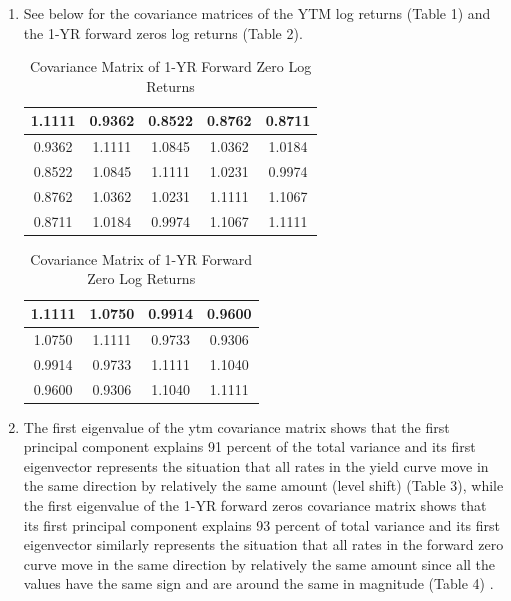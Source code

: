 \documentclass{article}
\begin{document}
\begin{enumerate}
\begin{enumerate}
    \end{enumerate}
    \item See below for the covariance matrices of the YTM log returns (Table 1) and the 1-YR forward zeros log returns (Table 2).
        \begin{table}[H]
        \begin{minipage}{0.5\linewidth}
        \centering
        \caption{Covariance Matrix of YTM Log Returns}
        \begin{tabular}{|c|c|c|c|c|}
        \hline
        1.1111 & 0.9362 & 0.8522 & 0.8762 & 0.8711 \\ \hline
        0.9362 & 1.1111 & 1.0845 & 1.0362 & 1.0184 \\ \hline
        0.8522 & 1.0845 & 1.1111 & 1.0231 & 0.9974 \\ \hline
        0.8762 & 1.0362 & 1.0231 & 1.1111 & 1.1067 \\ \hline
        0.8711 & 1.0184 & 0.9974 & 1.1067 & 1.1111 \\ \hline

     
        \end{tabular}
        \end{minipage}
        \hfill
        \begin{minipage}{0.5\linewidth}
        \centering
        \caption{Covariance Matrix of 1-YR Forward Zero Log Returns}
        \begin{tabular}{|c|c|c|c|}
        \hline
        1.1111 & 1.0750 & 0.9914 & 0.9600 \\ \hline
        1.0750 & 1.1111 & 0.9733 & 0.9306 \\ \hline
        0.9914 & 0.9733 & 1.1111 & 1.1040 \\ \hline
        0.9600 & 0.9306 & 1.1040 & 1.1111 \\ \hline
        \end{tabular}
        \end{minipage}
        \end{table}
    \item The first eigenvalue of the ytm covariance matrix shows that the first principal component explains 91 percent of the total variance and its first eigenvector represents the situation that all rates in the yield curve move in the same direction by relatively the same amount (level shift) (Table 3), while the first eigenvalue of the 1-YR forward zeros covariance matrix shows that its first principal component explains 93 percent of total variance and its first eigenvector similarly represents the situation that all rates in the forward zero curve move in the same direction by relatively the same amount since all the values have the same sign and are around the same in magnitude (Table 4) \cite{pca2023yield}.


\end{enumerate}
\end{document}
